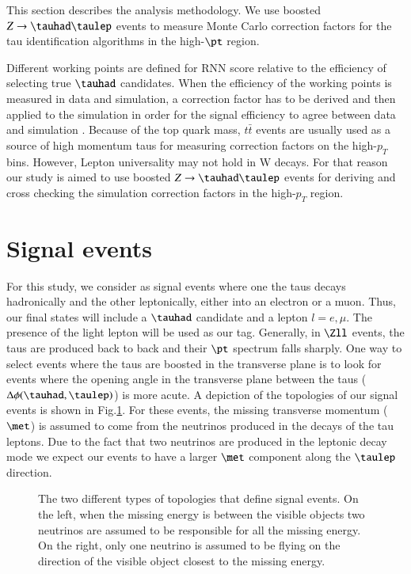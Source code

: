 This section describes the analysis methodology. We use boosted $Z\to\tauhad\taulep$ events to measure Monte Carlo correction factors for the tau identification algorithms in the high-$\pt$ region.

Different working points are defined for RNN score relative to the efficiency of selecting true $\tauhad$ candidates. When the efficiency of the working points is measured in data and simulation, a correction factor has to be derived and then applied to the simulation in order for the signal efficiency to agree between data and simulation \cite{ATLAS:2017mpa}. Because of the top quark mass, $t\bar{t}$ events are usually used as a source of high momentum taus for measuring correction factors on the high-$p_T$ bins. However, Lepton universality may not hold in W decays. For that reason our study is aimed to use boosted $Z\to\tauhad\taulep$ events for deriving and cross checking the simulation correction factors in the high-$p_T$ region.   
\section{Signal events}\label{signalevents}
For this study, we consider as signal events where one the taus decays hadronically and the other leptonically, either into an electron or a muon. Thus, our final states will include a $\tauhad$ candidate and a lepton $l=e,\mu$. The presence of the light lepton will be used as our tag. 
Generally, in $\Zll$ events, the taus are produced back to back and their $\pt$ spectrum falls sharply. One way to select events where the taus are boosted in the transverse plane is to look for events where the opening angle in the transverse plane between the taus ($\Delta\phi(\tauhad,\taulep)$) is more acute. A depiction of the topologies of our signal events is shown in Fig.\ref{Fig1}. For these events, the missing transverse momentum ($\met$) is assumed to come from the neutrinos produced in the decays of the tau leptons. Due to the fact that two neutrinos are produced in the leptonic decay mode we expect our events to have a larger $\met$ component along the $\taulep$ direction.
\begin{figure}[htbp]
	\centering
	\hfill
	\caption{The two different types of topologies that define signal events. On the left, when the missing energy is between the visible objects two neutrinos are assumed to be responsible for all the missing energy. On the right, only one neutrino is assumed to be flying on the direction of the visible object closest to the missing energy.}
	\label{Fig1}
\end{figure}